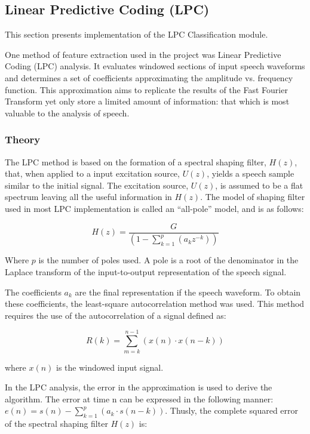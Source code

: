 \subsection{Linear Predictive Coding (LPC)}\label{sect:lpc}

This section presents implementation of the LPC Classification module.

One method of feature extraction used in the {\marf} project was Linear
Predictive Coding (LPC) analysis. It evaluates windowed sections of
input speech waveforms and determines a set of coefficients
approximating the amplitude vs. frequency function. This approximation
aims to replicate the results of the Fast Fourier Transform yet only
store a limited amount of information: that which is most valuable to
the analysis of speech.

\subsubsection{Theory}

The LPC method is based on the formation of a spectral shaping filter,
$H(z)$, that, when applied to a input excitation source, $U(z)$, yields a
speech sample similar to the initial signal. The excitation source,
$U(z)$, is assumed to be a flat spectrum leaving all the useful
information in $H(z)$. The model of shaping filter used in most LPC
implementation is called an ``all-pole'' model, and is as follows:

$$ H(z) = \frac{G}{\left(1 - \displaystyle\sum_{k=1}^{p}(a_{k} z^{-k})\right)} $$

Where $p$ is the number of poles used. A pole is a root of the
denominator in the Laplace transform of the input-to-output
representation of the speech signal.

The coefficients $a_{k}$ are the final representation if the speech
waveform. To obtain these coefficients, the least-square
autocorrelation method was used. This method requires the use of the
autocorrelation of a signal defined as:

$$ R(k) = \displaystyle\sum_{m=k}^{n-1}(x(n) \cdot x(n-k)) $$

where $x(n)$ is the windowed input signal.

In the LPC analysis, the error in the approximation is used to derive
the algorithm. The error at time n can be expressed in the following
manner: $ e(n) = s(n) - \displaystyle\sum_{k=1}^{p}\left(a_{k} \cdot s(n-k)\right) $. Thusly,
the complete squared error of the spectral shaping filter $H(z)$ is:

